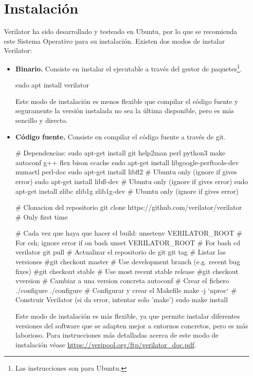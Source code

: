 \section{Instalación}\label{sec:instalacion}
Verilator ha sido desarrollado y testeado en Ubuntu, por lo que se recomienda este Sistema Operativo para su instalación. Existen dos modos de instalar Verilator:
\begin{itemize}
    \item \textbf{Binario.} Consiste en instalar el ejecutable a través del gestor de paquetes\footnote{Las instrucciones son para Ubuntu.}.

    \begin{mycode}[style=bashstyle]
sudo apt install verilator
    \end{mycode}

    Este modo de instalación es menos flexible que compilar el código fuente y seguramente la versión instalada no sea la última disponible, pero es más sencillo y directo.
    
    \item \textbf{Código fuente.} Consiste en compilar el código fuente a través de git.

    \begin{mycode}[style=bashstyle]
# Dependencias:
sudo apt-get install git help2man perl python3 make autoconf g++ flex bison ccache
sudo apt-get install libgoogle-perftools-dev numactl perl-doc
sudo apt-get install libfl2 # Ubuntu only (ignore if gives error)
sudo apt-get install libfl-dev # Ubuntu only (ignore if gives error)
sudo apt-get install zlibc zlib1g zlib1g-dev # Ubuntu only (ignore if gives error)

# Clonacion del repositorio
git clone https://github.com/verilator/verilator # Only first time
        
# Cada vez que haya que hacer el build:
unsetenv VERILATOR_ROOT # For csh; ignore error if on bash
unset VERILATOR_ROOT # For bash
cd verilator
git pull                 # Actualizar el repositorio de git
git tag                  # Listar las versiones
#git checkout master     # Use development branch (e.g. recent bug fixes)
#git checkout stable     # Use most recent stable release
#git checkout v{version} # Cambiar a una version concreta
autoconf                 # Crear el fichero ./configure
./configure              # Configurar y crear el Makefile
make -j `nproc`          # Construir Verilator (si da error, intentar solo 'make')
sudo make install
    \end{mycode}

    Este modo de instalación es más flexible, ya que permite instalar diferentes versiones del software que se adapten mejor a entornos concretos, pero es más laborioso. Para instrucciones más detalladas acerca de este modo de instalación véase \url{https://veripool.org/ftp/verilator_doc.pdf}.
\end{itemize}
